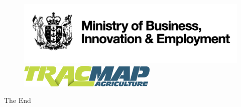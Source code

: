 \documentclass{beamer}
\begin{document}


\begin{frame}
\begin{figure}
\centering
\includegraphics[]{plots/mbie}\\
\includegraphics[]{plots/tracmap-agriculture}
\centering
\end{figure}
\end{frame}



%
%
%
%
%


\begin{frame}
\Huge{\centerline{The End}}
\end{frame}

\end{document}
